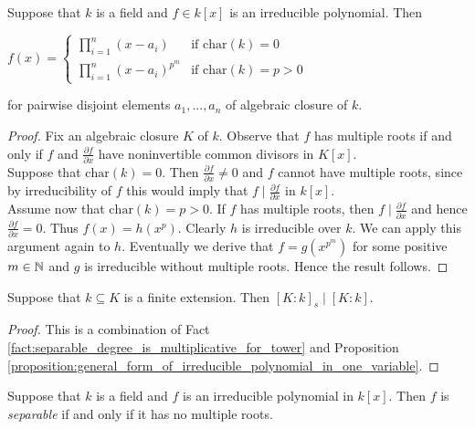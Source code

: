 \begin{proposition}\label{proposition:general_form_of_irreducible_polynomial_in_one_variable}
Suppose that $k$ is a field and $f\in k[x]$ is an irreducible polynomial. Then
\begin{center}
$f(x)=\begin{cases} \prod^n_{i=1}(x-a_i) &\mbox{if } \mathrm{char}(k)=0 \\
 \prod^n_{i=1}(x-a_i)^{p^m}& \mbox{if } \mathrm{char}(k)=p>0  \end{cases} $
\end{center}
for pairwise disjoint elements $a_1,...,a_n$ of algebraic closure of $k$.
\end{proposition}
\begin{proof}
Fix an algebraic closure $K$ of $k$. Observe that $f$ has multiple roots if and only if $f$ and $\frac{\partial f}{\partial x}$ have noninvertible common divisors in $K[x]$.\\
Suppose that $\mathrm{char}(k)=0$. Then $\frac{\partial f}{\partial x}\neq 0$ and $f$ cannot have multiple roots, since by irreducibility of $f$ this would imply that $f\mid \frac{\partial f}{\partial x}$ in $k[x]$.\\
Assume now that $\mathrm{char}(k)=p>0$. If $f$ has multiple roots, then $f\mid \frac{\partial f}{\partial x}$ and hence  $\frac{\partial f}{\partial x}=0$. Thus $f(x)=h(x^p)$. Clearly $h$ is irreducible over $k$. We can apply this argument again to $h$. Eventually we derive that $f=g(x^{p^m})$ for some positive $m\in {\mathbb N}$ and $g$ is irreducible without multiple roots. Hence the result follows.
\end{proof}

\begin{corollary}\label{corollary:separable_degree_divides_degree}
Suppose that $k\subseteq K$ is a finite extension. Then $[K:k]_s\mid [K:k]$.
\end{corollary}
\begin{proof}
This is a combination of Fact \ref{fact:separable_degree_is_multiplicative_for_tower} and Proposition \ref{proposition:general_form_of_irreducible_polynomial_in_one_variable}.
\end{proof}

\begin{definition}
Suppose that $k$ is a field and $f$ is an irreducible polynomial in $k[x]$. Then $f$ is \textit{separable} if and only if it has no multiple roots.
\end{definition}

